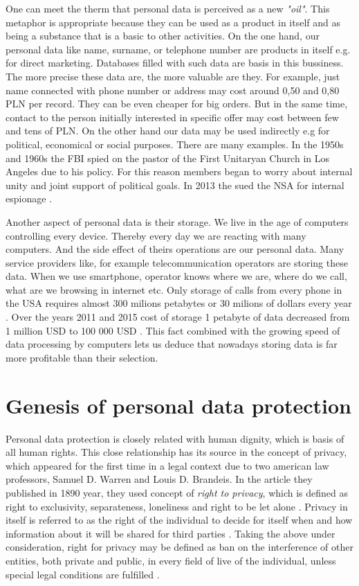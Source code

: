 \documentclass[en, noamssymb]{mgr}
\begin{document}
\indent One can meet the therm that personal data is perceived as a new \textit{"oil"}. This metaphor is appropriate because they can be used as a product in itself and as being a substance that is a basic to other activities. On the one hand, our personal data like name, surname, or telephone number are products in itself e.g. for direct marketing. Databases filled with such data are basis in this bussiness. The more precise these data are, the more valuable are they. For example, just name connected with phone number or address may cost around 0,50 and 0,80 PLN per record. They can be even cheaper for big orders. But in the same time, contact to the person initially interested in specific offer may cost between few and tens of PLN. On the other hand our data may be used indirectly e.g for political, economical or social purposes. There are many examples. In the 1950s and 1960s the FBI spied on the pastor of the First Unitaryan Church in Los Angeles due to his policy. For this reason members began to worry about internal unity and joint support of political goals. In 2013 the sued the NSA for internal espionage \cite{dane_i_goliat}.

\indent Another aspect of personal data is their storage. We live in the age of computers controlling every device. Thereby every day we are reacting with many computers. And the side effect of theirs operations are our personal data. Many service providers like, for example telecommunication operators are storing these data. When we use smartphone, operator knows where we are, where do we call, what are we browsing in internet etc. Only storage of calls from every phone in the USA requires almost 300 milions petabytes or 30 milions of dollars every year \cite{dane_i_goliat}. Over the years 2011 and 2015 cost of storage 1 petabyte of data decreased from 1 million USD to 100 000 USD \cite{dane_i_goliat}. This fact combined with the growing speed of data processing by computers lets us deduce that nowadays storing data is far more profitable than their selection.



\section{Genesis of personal data protection}

Personal data protection is closely related with human dignity, which is basis of all human rights. This close relationship has its source in the concept of privacy, which appeared for the first time in a legal context due to two american law professors, Samuel D. Warren and Louis D. Brandeis. In the article they published in 1890 year, they used concept of \textit{right to privacy}, which is defined as right to exclusivity, separateness, loneliness and right to be let alone \cite{geneza_odo}. Privacy in itself is referred to as the right of the individual to decide for itself when and how information about it will be shared for third parties \cite{geneza_odo}. Taking the above under consideration, right for privacy may be defined as ban on the interference of other entities, both private and public, in every field of live of the individual, unless special legal conditions are fulfilled \cite{geneza_odo}.
\end{document}
